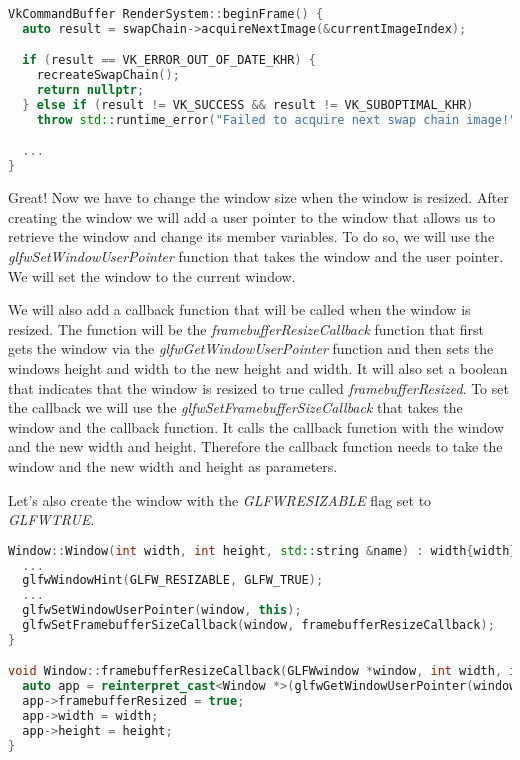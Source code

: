 \documentclass[12pt]{report} \usepackage{preamble}
\begin{document}
\begin{lstlisting}[language=C++]
VkCommandBuffer RenderSystem::beginFrame() {
  auto result = swapChain->acquireNextImage(&currentImageIndex);

  if (result == VK_ERROR_OUT_OF_DATE_KHR) {
    recreateSwapChain();
    return nullptr;
  } else if (result != VK_SUCCESS && result != VK_SUBOPTIMAL_KHR)
    throw std::runtime_error("Failed to acquire next swap chain image!");

  ...
}
\end{lstlisting}

Great! Now we have to change the window size when the window is resized. After creating the window we will add a user pointer to the window that
allows us to retrieve the window and change its member variables. To do so, we will use the \textit{glfwSetWindowUserPointer} function that takes the window
and the user pointer. We will set the window to the current window.

We will also add a callback function that will be called when the window is resized.
The function will be the \textit{framebufferResizeCallback} function that first gets the window via the \textit{glfwGetWindowUserPointer} function and then
sets the windows height and width to the new height and width.
It will also set a boolean that indicates that the window is resized to true called \textit{framebufferResized}.
To set the callback we will use the \textit{glfwSetFramebufferSizeCallback}
that takes the window and the callback function. It calls the callback function with the window and the new width and height. Therefore the callback function
needs to take the window and the new width and height as parameters.

Let's also create the window with the \textit{GLFW\textunderscore RESIZABLE} flag set to \textit{GLFW\textunderscore TRUE}.

\begin{lstlisting}[language=C++]
Window::Window(int width, int height, std::string &name) : width{width}, height{height}, name{name} {
  ...
  glfwWindowHint(GLFW_RESIZABLE, GLFW_TRUE);
  ...
  glfwSetWindowUserPointer(window, this);
  glfwSetFramebufferSizeCallback(window, framebufferResizeCallback);
}

void Window::framebufferResizeCallback(GLFWwindow *window, int width, int height) {
  auto app = reinterpret_cast<Window *>(glfwGetWindowUserPointer(window));
  app->framebufferResized = true;
  app->width = width;
  app->height = height;
}
\end{lstlisting}
\end{document}
